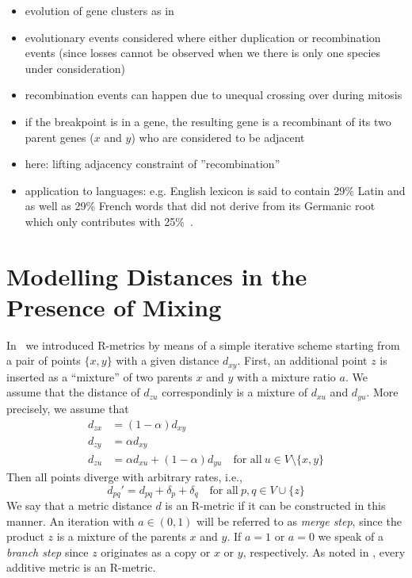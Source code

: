 \documentclass[amsmath]{lni}
\begin{document}
\begin{itemize}
\item evolution of gene clusters as in~\cite{Prohaska:17a}
 \item evolutionary events considered where either duplication 
 or recombination events (since losses cannot be observed when 
 we there is only one species under consideration)
 \item recombination events can happen due to unequal crossing
 over during mitosis
 \item if the breakpoint is in a gene, the resulting gene is
 a recombinant of its two parent genes ($x$ and $y$) who are
 considered to be adjacent
 \item here: lifting adjacency constraint of ''recombination''
 \item application to languages: e.g. English lexicon is said
 to contain 29\% Latin and as well as 29\% French words that 
 did not derive from its Germanic root which only contributes 
 with 25\%~\cite{Finkenstaedt:73}.
\end{itemize}


\section{Modelling Distances in the Presence of Mixing} 

In~\cite{Prohaska:17a} we introduced R-metrics by means of a simple
iterative scheme starting from a pair of points $\{x,y\}$ with a given
distance $d_{xy}$.  First, an additional point $z$ is inserted as a
``mixture'' of two parents $x$ and $y$ with a mixture ratio $a$. We assume
that the distance of $d_{zu}$ correspondinly is a mixture of $d_{xu}$ and
$d_{yu}$. More precisely, we assume that
\begin{equation} 
\begin{split} 
  d_{zx} & = (1-\alpha)  d_{xy} \\
  d_{zy} & =   \alpha    d_{xy} \\
  d_{zu} & =   \alpha    d_{xu} + (1-\alpha)  d_{yu} \quad\textrm{for all}\ 
                     u\in V\setminus\{ x,y \}
\end{split}
\end{equation} 
Then all points diverge with arbitrary rates, i.e., 
\begin{equation} 
  d_{pq}' = d_{pq} + \delta_p + \delta_q \quad\textrm{for all}\ 
  p,q \in V\cup\{z\} 
\end{equation} 
We say that a metric distance $d$ is an R-metric if it can be constructed
in this manner. An iteration with $a\in(0,1)$ will be referred to as
\emph{merge step}, since the product $z$ is a mixture of the parents $x$
and $y$. If $a=1$ or $a=0$ we speak of a \emph{branch step} since
$z$ originates as a copy or $x$ or $y$, respectively. As noted in
\cite{Prohaska:17a}, every additive metric is an R-metric.
\end{document}
